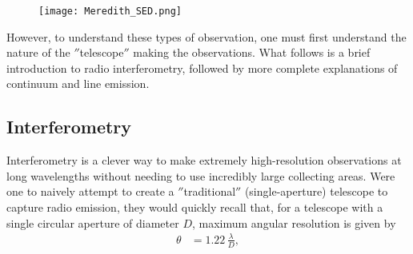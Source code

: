 \begin{figure}
\centering
  \texttt{[image: Meredith\_SED.png]}
  \label{fig:SED}
\end{figure}


However, to understand these types of observation, one must first understand the nature of the $''$telescope$''$ making the observations. What follows is a brief introduction to radio interferometry, followed by more complete explanations of continuum and line emission.



\subsection{Interferometry}
\label{section:interferometry}
Interferometry is a clever way to make extremely high-resolution observations at long wavelengths without needing to use incredibly large collecting areas. Were one to naively attempt to create a $''$traditional$''$ (single-aperture) telescope to capture radio emission, they would quickly recall that, for a telescope with a single circular aperture of diameter $D$, maximum angular resolution is given by
\begin{align}
  \theta &= 1.22 \, \frac{\lambda}{D},
\end{align}

